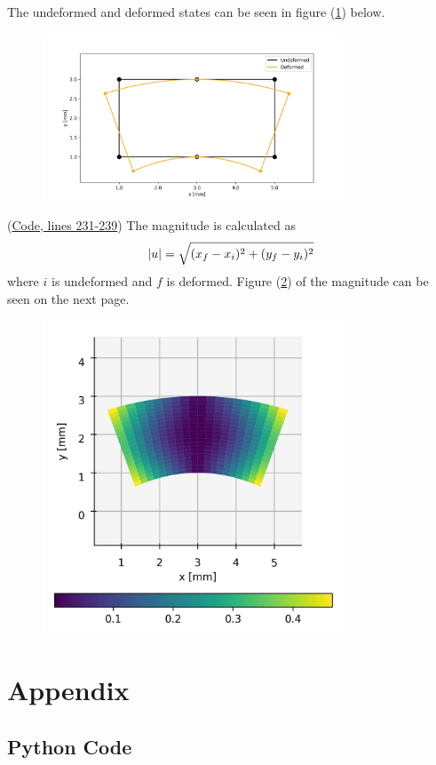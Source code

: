 \documentclass{article}
\begin{document}
\begin{enumerate}
The undeformed and deformed states can be seen in figure (\ref{fig:defvsun}) below. 
\begin{figure}[H]
	\centering
	\includegraphics[width=0.8\textwidth]{Photos/p7.jpg}
	\caption{}
	\label{fig:defvsun}
\end{figure}


\end{enumerate}

(\hyperref[code1]{Code, lines 231-239}) The magnitude is calculated as 
\begin{align}
	\abs{u} = \sqrt{(x_f-x_i)^2 + (y_f-y_i)^2}
\end{align}
where $i$ is undeformed and $f$ is deformed. Figure (\ref{fig:magdist}) of the magnitude can be seen on the next page. 
\begin{figure}[H]
	\centering
	\includegraphics[width=0.8\textwidth]{Photos/p72.jpg}
	\caption{}
	\label{fig:magdist}
\end{figure}

\newpage
\section*{Appendix}
\subsection*{Python Code} \label{code1}
\inputminted[bgcolor=bg, linenos, numbersep=5pt, frame=single, framesep=2mm]{Python}{Code/a2v22.py}
\end{document}
